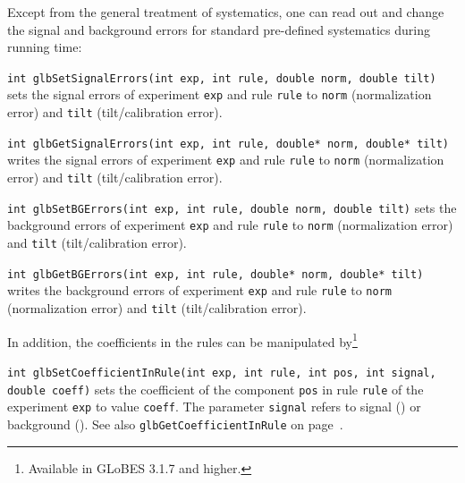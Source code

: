 
Except from the general treatment of systematics, one can read out
and change the signal and background errors for standard pre-defined systematics
during running time:
\begin{function}
{\tt int glbSetSignalErrors(int exp, int rule, double norm, double tilt)}
sets the signal errors of experiment {\tt exp} and rule {\tt rule}
to {\tt norm} (normalization error) and {\tt tilt} (tilt/calibration error).
\end{function}
\begin{function}
{\tt int glbGetSignalErrors(int exp, int rule, double* norm, double* tilt)}
writes the signal errors of experiment {\tt exp} and rule {\tt rule}
to {\tt norm} (normalization error) and {\tt tilt} (tilt/calibration error).
\end{function}
\begin{function}
{\tt int glbSetBGErrors(int exp, int rule, double norm, double tilt)}
sets the background errors of experiment {\tt exp} and rule {\tt rule}
to {\tt norm} (normalization error) and {\tt tilt} (tilt/calibration error).
\end{function}
\begin{function}
{\tt int glbGetBGErrors(int exp, int rule, double* norm, double* tilt)}
writes the background errors of experiment {\tt exp} and rule {\tt rule}
to {\tt norm} (normalization error) and {\tt tilt} (tilt/calibration error).
\end{function}
In addition, the coefficients in the rules can be manipulated by\footnote{Available in GLoBES 3.1.7 and higher.}
\begin{function}
 \label{glbSetCoefficientInRule}
{\tt int glbSetCoefficientInRule(int exp, int rule, int pos, int signal, double coeff)}
sets the coefficient of the component {\tt pos} in rule {\tt rule} 
of the experiment {\tt exp} to value {\tt coeff}.
The parameter {\tt signal} refers to signal () or background
(). See also {\tt glbGetCoefficientInRule} on page~\pageref{glbGetCoefficientInRule}.
\end{function}


